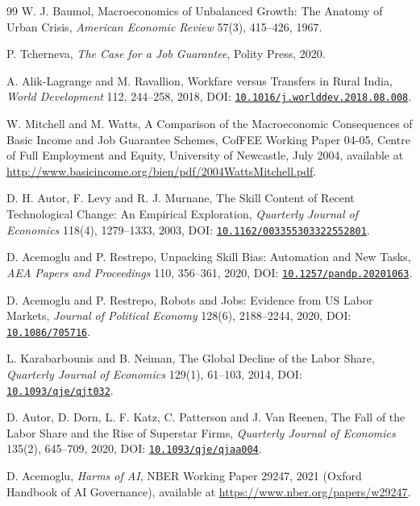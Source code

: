 \documentclass[review,12pt]{elsarticle}
\theoremstyle{plain}
\theoremstyle{definition}
\theoremstyle{remark}
\begin{document}
\begin{thebibliography}{99}
 W. J. Baumol, Macroeconomics of Unbalanced Growth: The Anatomy of Urban Crisis, \emph{American Economic Review} 57(3), 415--426, 1967.

 P. Tcherneva, \emph{The Case for a Job Guarantee}, Polity Press, 2020.

 A. Alik-Lagrange and M. Ravallion, Workfare versus Transfers in Rural India, \emph{World Development} 112, 244--258, 2018, DOI: \href{https://doi.org/10.1016/j.worlddev.2018.08.008}{\texttt{10.1016/j.worlddev.2018.08.008}}.

 W. Mitchell and M. Watts, A Comparison of the Macroeconomic Consequences of Basic Income and Job Guarantee Schemes, CofFEE Working Paper 04-05, Centre of Full Employment and Equity, University of Newcastle, July 2004, available at \url{http://www.basicincome.org/bien/pdf/2004WattsMitchell.pdf}.

 D. H. Autor, F. Levy and R. J. Murnane, The Skill Content of Recent Technological Change: An Empirical Exploration, \emph{Quarterly Journal of Economics} 118(4), 1279--1333, 2003, DOI: \href{https://doi.org/10.1162/003355303322552801}{\texttt{10.1162/003355303322552801}}.

 D. Acemoglu and P. Restrepo, Unpacking Skill Bias: Automation and New Tasks, \emph{AEA Papers and Proceedings} 110, 356--361, 2020, DOI: \href{https://doi.org/10.1257/pandp.20201063}{\texttt{10.1257/pandp.20201063}}.

 D. Acemoglu and P. Restrepo, Robots and Jobs: Evidence from US Labor Markets, \emph{Journal of Political Economy} 128(6), 2188--2244, 2020, DOI: \href{https://doi.org/10.1086/705716}{\texttt{10.1086/705716}}.

 L. Karabarbounis and B. Neiman, The Global Decline of the Labor Share, \emph{Quarterly Journal of Economics} 129(1), 61--103, 2014, DOI: \href{https://doi.org/10.1093/qje/qjt032}{\texttt{10.1093/qje/qjt032}}.

 D. Autor, D. Dorn, L. F. Katz, C. Patterson and J. Van Reenen, The Fall of the Labor Share and the Rise of Superstar Firms, \emph{Quarterly Journal of Economics} 135(2), 645--709, 2020, DOI: \href{https://doi.org/10.1093/qje/qjaa004}{\texttt{10.1093/qje/qjaa004}}.

 D. Acemoglu, \emph{Harms of AI}, NBER Working Paper 29247, 2021 (Oxford Handbook of AI Governance), available at \url{https://www.nber.org/papers/w29247}.


\end{thebibliography}
\end{document}
